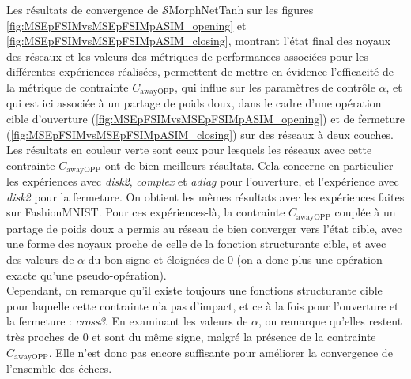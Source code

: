 \vspace{-1.0mm}
Les résultats de convergence de $\mathcal{S}$MorphNetTanh sur les figures \ref{fig:MSEpFSIMvsMSEpFSIMpASIM_opening} et \ref{fig:MSEpFSIMvsMSEpFSIMpASIM_closing}, montrant l'état final des noyaux des réseaux et les valeurs des métriques de performances associées pour les différentes expériences réalisées, permettent de mettre en évidence l'efficacité de la métrique de contrainte $C_\text{awayOPP}$, qui influe sur les paramètres de contrôle $\alpha$, et qui est ici associée à un partage de poids doux, dans le cadre d'une opération cible d'ouverture (\ref{fig:MSEpFSIMvsMSEpFSIMpASIM_opening}) et de fermeture (\ref{fig:MSEpFSIMvsMSEpFSIMpASIM_closing}) sur des réseaux à deux couches. \\

\vspace{-0.6mm}
\noindent Les résultats en couleur verte sont ceux pour lesquels les réseaux avec cette contrainte $C_\text{awayOPP}$ ont de bien meilleurs résultats. Cela concerne en particulier les expériences avec \textit{disk2}, \textit{complex} et \textit{adiag} pour l'ouverture, et l'expérience avec \textit{disk2} pour la fermeture. On obtient les mêmes résultats avec les expériences faites sur FashionMNIST. Pour ces expériences-là, la contrainte $C_\text{awayOPP}$ couplée à un partage de poids doux a permis au réseau de bien converger vers l'état cible, avec une forme des noyaux proche de celle de la fonction structurante cible, et avec des valeurs de $\alpha$ du bon signe et éloignées de $0$ (on a donc plus une opération exacte qu'une pseudo-opération). \\

\vspace{-0.6mm}
\noindent Cependant, on remarque qu'il existe toujours une fonctions structurante cible pour laquelle cette contrainte n'a pas d'impact, et ce à la fois pour l'ouverture et la fermeture : \textit{cross3}. En examinant les valeurs de $\alpha$, on remarque qu'elles restent très proches de $0$ et sont du même signe, malgré la présence de la contrainte $C_\text{awayOPP}$. Elle n'est donc pas encore suffisante pour améliorer la convergence de l'ensemble des échecs.
